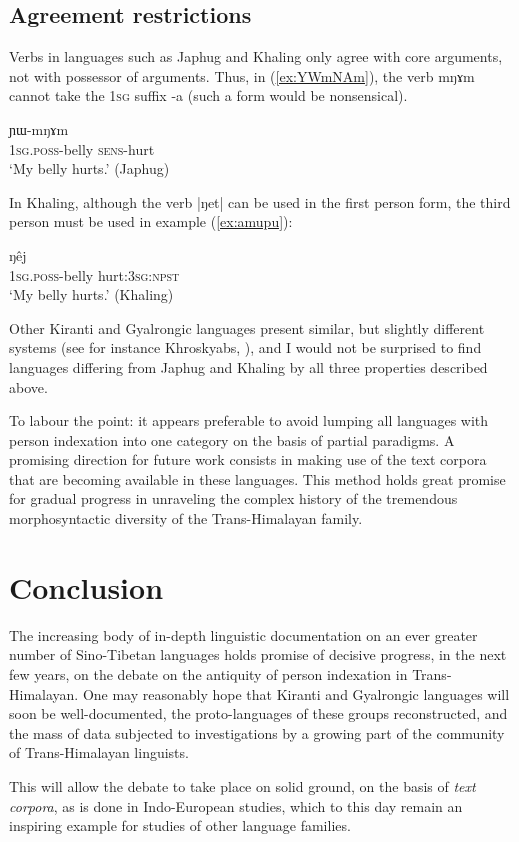 \documentclass[oldfontcommands,oneside,a4paper,11pt]{article}
\newcommand{\ipa}[1]{{\phon \mbox{#1}}} %
\begin{document}
\subsection{Agreement restrictions}
Verbs in languages such as Japhug and Khaling only agree with core arguments, not with possessor of arguments. Thus, in (\ref{ex:YWmNAm}), the verb \ipa{mŋɤm} cannot take the \textsc{1sg} suffix \ipa{-a} (such a form would be nonsensical).

\begin{exe}
\ex \label{ex:YWmNAm}
\gll \ipa{a-xtu} 	\ipa{ɲɯ-mŋɤm} \\
\textsc{1sg.poss}-belly \textsc{sens}-hurt \\
\glt `My belly hurts.' (Japhug)
\end{exe}

In Khaling, although the verb \ipa{|ŋet|} can be used in the first person form, the third person must be used in example (\ref{ex:amupu}):

\begin{exe}
\ex \label{ex:amupu}
\gll \ipa{ʔʌ-mupu} 	\ipa{ŋêj} \\
\textsc{1sg.poss}-belly hurt:\textsc{3sg:npst} \\
\glt `My belly hurts.' (Khaling)
\end{exe}

Other Kiranti and Gyalrongic languages present similar, but slightly different systems (see for instance Khroskyabs, \citealt{lai15person}), and I would not be surprised to find languages differing from Japhug and Khaling by all three properties described above. 

To labour the point: it appears preferable to avoid lumping all languages with person indexation into one category on the basis of partial paradigms. A promising direction for future work consists in making use of the text corpora that are becoming available in these languages. This method holds great promise for gradual progress in unraveling the complex history of  the tremendous morphosyntactic diversity of the Trans-Himalayan family.

\section{Conclusion}

The increasing body of in-depth linguistic documentation on an ever greater number of Sino-Tibetan languages holds promise of decisive progress, in the next few years, on the debate on the antiquity of person indexation in Trans-Himalayan. One may reasonably hope that Kiranti and Gyalrongic languages will soon be well-documented, the proto-languages of these groups reconstructed, and the mass of data subjected to investigations by a growing part of  the community of Trans-Himalayan linguists.

This will allow the debate to take place on solid ground,  on the basis of \textit{text corpora}, as is done in Indo-European studies, which to this day remain an inspiring example for studies of other language families.

\charis


\end{document}
